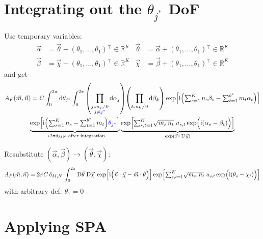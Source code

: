 \documentclass[
	english,
	a4paper,
	fontsize=10pt,
	parskip=half,
	titlepage=true,
	DIV=12,
	final
]{scrreprt}
\newcommand*{\thus}{\ensuremath{\rightarrow}\xspace}
\newcommand*{\transp}{\ensuremath{^\intercal}}
\newcommand*{\iunit}{\ensuremath{\mathrm{i}}}
\newcommand*{\setReals}    {\ensuremath{\mathbb{R}}}
\newcommand*{\DD}[1]{\ensuremath{\text{D}\vec{#1}\;}}
\begin{document}
\section{Integrating out the $\theta_{j^*}$ DoF}
Use temporary variables:
\begin{align}
	\vec{\alpha} &= \vec{\theta} - (\theta_1, \ldots, \theta_1)\transp \in \setReals^{K}
	&
	\vec{\theta} &= \vec{\alpha} + (\theta_1, \ldots, \theta_1)\transp \in \setReals^{K}
\\
	\vec{\beta } &= \vec{\chi  } - (\theta_1, \ldots, \theta_1)\transp \in \setReals^{K}
	&
	\vec{\chi  } &= \vec{\beta } + (\theta_1, \ldots, \theta_1)\transp \in \setReals^{K}
\end{align}
and get
\begin{multline}
	A_F(\vec{m}, \vec{n})
=
	C
	\int_{0}^{2\pi} {\color{blue} \dd{\theta_{j^*}}}
	\int_{0}^{2\pi}
		\qty( \prod_{\substack{j : m_j \neq 0 \\ {\color{blue} j \neq j^*}}} \dd{\alpha_j} )
		\qty( \prod_{k : n_k \neq 0}                 \dd{\beta_k} )
			\exp[
				\iunit \qty(
				{\textstyle \sum_{s=1}^{K}   n_s \beta _s}   -
				{\textstyle \sum_{t=1}^{b^*} m_t \alpha_t}
			)]
\\
	\underbrace{
	\exp[
		\iunit \qty(
			{\textstyle \sum_{s=1}^{K}   n_s}   -
			{\textstyle \sum_{t=1}^{b^*} m_t}
		)
		{\color{blue} \theta_{j^*}}
	]
	}_{\thus 2\pi\delta_{MN} \text{ after integration}}
	\underbrace{
	\exp[
		{\textstyle \sum_{s,t=1}^{K} }
			\sqrt{m_s \, n_t} \;
			u_{s,t}
			\exp(\Big. \iunit(\alpha_s - \beta_t) )
	]}_{\exp( \vec{x}\transp \, \mathbb{U} \, \vec{y})}
\end{multline}

Resubstitute $(\vec{\alpha}, \vec{\beta}) \to (\vec{\theta}, \vec{\chi})$:
\begin{align}	
	A_F(\vec{m}, \vec{n})
=
	2\pi C \, \delta_{M,N} \,
	\int_{0}^{2\pi}
		\DD{\theta} \DD{\chi}
	\exp[
		\iunit \qty(
			\vec{n} \cdot \vec{\chi}
			-
			\vec{m} \cdot \vec{\theta}
		)]
	\exp[
		{\textstyle \sum_{s,t=1}^{K} }
			\sqrt{m_s, n_t} \;
			u_{s,t}
			\exp(\Big. \iunit(\theta_s - \chi_t) )
	]
\label{eqn:BSA_preSPA}
\end{align}
with arbitrary def: $\theta_1 = 0$

\section{Applying SPA}
\end{document}
